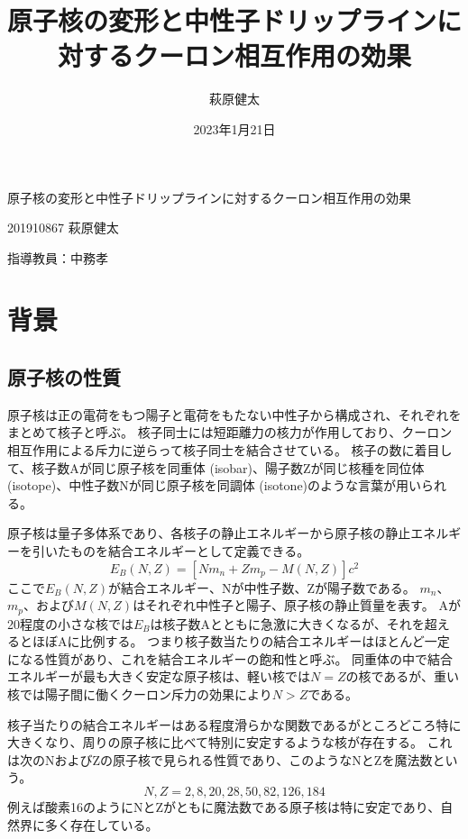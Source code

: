 \documentclass[12pt]{jarticle}
\title{原子核の変形と中性子ドリップラインに対するクーロン相互作用の効果}
\author{萩原健太}
\date{2023年1月21日}
\begin{document}
\begin{center}
    {\Large
        原子核の変形と中性子ドリップラインに対するクーロン相互作用の効果
    }
\end{center}
\vspace{1em}
\begin{flushright}
  201910867 萩原健太

  指導教員：中務孝
\end{flushright}


\section{背景}
\subsection{原子核の性質}
原子核は正の電荷をもつ陽子と電荷をもたない中性子から構成され、それぞれをまとめて核子と呼ぶ。
核子同士には短距離力の核力が作用しており、クーロン相互作用による斥力に逆らって核子同士を結合させている。
核子の数に着目して、核子数Aが同じ原子核を同重体 (isobar)、陽子数Zが同じ核種を同位体 (isotope)、中性子数Nが同じ原子核を同調体 (isotone)のような言葉が用いられる。

原子核は量子多体系であり、各核子の静止エネルギーから原子核の静止エネルギーを引いたものを結合エネルギーとして定義できる。
\[
    E_B (N,Z) = [Nm_n + Zm_p - M(N,Z)]c^2
\]
ここで$E_B (N,Z)$が結合エネルギー、Nが中性子数、Zが陽子数である。
$m_n$、$m_p$、および$M(N,Z)$はそれぞれ中性子と陽子、原子核の静止質量を表す。
Aが20程度の小さな核では$E_B$は核子数Aとともに急激に大きくなるが、それを超えるとほぼAに比例する。
つまり核子数当たりの結合エネルギーはほとんど一定になる性質があり、これを結合エネルギーの飽和性と呼ぶ。
同重体の中で結合エネルギーが最も大きく安定な原子核は、軽い核では$N=Z$の核であるが、重い核では陽子間に働くクーロン斥力の効果により$N>Z$である。
\begin{figure}[h]
\end{figure}
核子当たりの結合エネルギーはある程度滑らかな関数であるがところどころ特に大きくなり、周りの原子核に比べて特別に安定するような核が存在する。
これは次のNおよびZの原子核で見られる性質であり、このようなNとZを魔法数という。
\[
    N,Z = 2,8,20,28,50,82,126,184    
\]
例えば酸素16のようにNとZがともに魔法数である原子核は特に安定であり、自然界に多く存在している。
\end{document}
